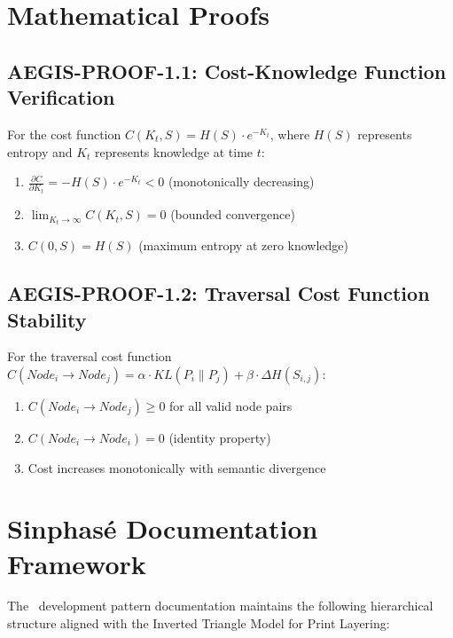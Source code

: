 \documentclass[12pt,twoside,openright]{report}
\begin{document}
\chapter{Mathematical Proofs}

\section{AEGIS-PROOF-1.1: Cost-Knowledge Function Verification}

\begin{theorem}
For the cost function $C(K_t, S) = H(S) \cdot e^{-K_t}$, where $H(S)$ represents entropy and $K_t$ represents knowledge at time $t$:
\begin{enumerate}
\item $\frac{\partial C}{\partial K_t} = -H(S) \cdot e^{-K_t} < 0$ (monotonically decreasing)
\item $\lim_{K_t \to \infty} C(K_t, S) = 0$ (bounded convergence)
\item $C(0, S) = H(S)$ (maximum entropy at zero knowledge)
\end{enumerate}
\end{theorem}

\section{AEGIS-PROOF-1.2: Traversal Cost Function Stability}

\begin{theorem}
For the traversal cost function $C(Node_i \rightarrow Node_j) = \alpha \cdot KL(P_i \| P_j) + \beta \cdot \Delta H(S_{i,j})$:
\begin{enumerate}
\item $C(Node_i \rightarrow Node_j) \geq 0$ for all valid node pairs
\item $C(Node_i \rightarrow Node_i) = 0$ (identity property)
\item Cost increases monotonically with semantic divergence
\end{enumerate}
\end{theorem}

\chapter{Sinphasé Documentation Framework}

The \sinphase\ development pattern documentation maintains the following hierarchical structure aligned with the Inverted Triangle Model for Print Layering:
\end{document}
